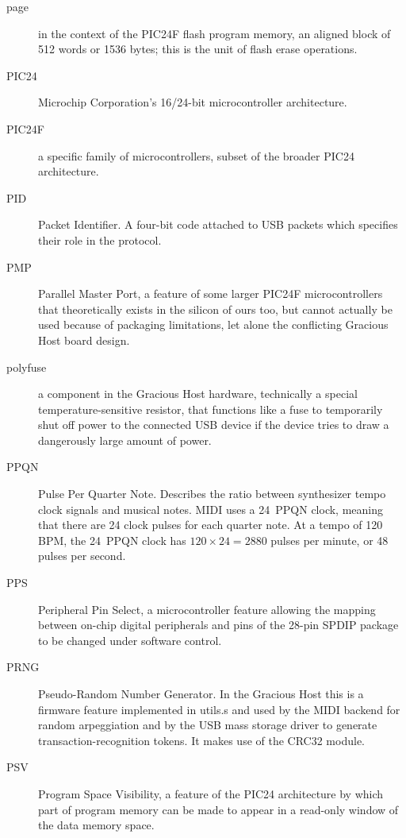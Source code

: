 \begin{description}
\item[page] in the context of the PIC24F flash program memory, an aligned
block of 512 words or 1536 bytes; this is the unit of flash erase
operations.

\item[PIC24] Microchip Corporation's 16/24-bit microcontroller architecture.

\item[PIC24F] a specific family of microcontrollers, subset of the broader
PIC24 architecture.

\item[PID] Packet Identifier.  A four-bit code attached to USB packets which
specifies their role in the protocol.

\item[PMP] Parallel Master Port, a feature of some larger PIC24F
microcontrollers that theoretically exists in the silicon of ours too, but
cannot actually be used because of packaging limitations, let alone the
conflicting Gracious Host board design.

\item[polyfuse] a component in the Gracious Host hardware, technically a
special temperature-sensitive resistor, that functions like a fuse to
temporarily shut off power to the connected USB device if the device tries
to draw a dangerously large amount of power.

\item[PPQN] Pulse Per Quarter Note.  Describes the ratio between synthesizer
tempo clock signals and musical notes.  MIDI uses a 24~PPQN clock, meaning
that there are 24 clock pulses for each quarter note.  At a tempo of 120
BPM, the 24~PPQN clock has $120\times 24 = 2880$ pulses per minute, or 48
pulses per second.

\item[PPS] Peripheral Pin Select, a microcontroller feature allowing the
mapping between on-chip digital peripherals and pins of the 28-pin SPDIP
package to be changed under software control.

\item[PRNG] Pseudo-Random Number Generator.  In the Gracious Host this is a
firmware feature implemented in utils.s and used by the MIDI backend for
random arpeggiation and by the USB mass storage driver to generate
transaction-recognition tokens.  It makes use of the CRC32 module.

\item[PSV] Program Space Visibility, a feature of the PIC24 architecture by
which part of program memory can be made to appear in a read-only window of
the data memory space.


\end{description}
